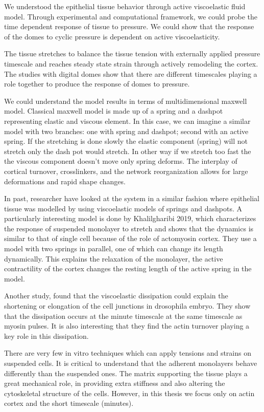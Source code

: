 We understood the epithelial tissue behavior through active viscoelastic
fluid model. Through experimental and computational framework, we could
probe the time dependent response of tissue to pressure. We could show
that the response of the domes to cyclic pressure is dependent on active
viscoelasticity.

The tissue stretches to balance the tissue tension with externally
applied pressure timescale and reaches steady state strain through
actively remodeling the cortex. The studies with digital domes show that
there are different timescales playing a role together to produce the
response of domes to pressure.

We could understand the model results in terms of multidimensional
maxwell model. Classical maxwell model is made up of a spring and a
dashpot representing elastic and viscous element. In this case, we can
imagine a similar model with two branches: one with spring and dashpot;
second with an active spring. If the stretching is done slowly the
elastic component (spring) will not stretch only the dash pot would
stretch. In other way if we stretch too fast the the viscous component
doesn't move only spring deforms. The interplay of cortical turnover,
crosslinkers, and the network reorganization allows for large
deformations and rapid shape changes.

In past, researcher have looked at the system in a similar fashion where
epithelial tissue was modelled by using viscoelastic models of springs
and dashpots. A particularly interesting model is done by Khalilgharibi
2019, which characterizes the response of suspended monolayer to stretch
and shows that the dynamics is similar to that of single cell because of
the role of actomyosin cortex. They use a model with two springs in
parallel, one of which can change its length dynamically. This explains
the relaxation of the monolayer, the active contractility of the cortex
changes the resting length of the active spring in the model.

Another study, found that the viscoelastic dissipation could explain the
shortening or elongation of the cell junctions in drosophila embryo.
They show that the dissipation occurs at the minute timescale at the
same timescale as myosin pulses. It is also interesting that they find
the actin turnover playing a key role in this dissipation.

There are very few in vitro techniques which can apply tensions and
strains on suspended cells. It is critical to understand that the
adherent monolayers behave differently than the suspended ones. The
matrix supporting the tissue plays a great mechanical role, in providing
extra stiffness and also altering the cytoskeletal structure of the
cells. However, in this thesis we focus only on actin cortex and the
short timescale (minutes).

